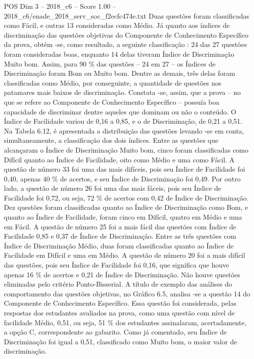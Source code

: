 \begin{textsample}{POS Dim 3 – 2018\_c6 – Score 1.00 – 2018\_c6/enade\_2018\_serv\_soc\_f2ecfc474e.txt}
Duas questões foram classificadas como Fácil, e outras 13 consideradas como Médio.
Já quanto aos índices de discriminação das questões objetivas do Componente de Conhecimento Específico da prova, obtém -se, como resultado, a seguinte classificação : 24 das 27 questões foram consideradas boas, enquanto 14 delas tiveram Índice de Discriminação Muito bom.
Assim, para 90 \% das questões – 24 em 27 – os Índices de Discriminação foram Bom ou Muito bom.
Dentre as demais, três delas foram classificadas como Médio, por conseguinte, a quantidade de questões nos patamares mais baixos de discriminação.
Constata -se, assim, que a prova – no que se refere ao Componente de Conhecimento Específico – possuía boa capacidade de discriminar dentre aqueles que dominam ou não o conteúdo.
O Índice de Facilidade variou de 0,16 a 0,85, e o de Discriminação, de 0,21 a 0,51.
Na Tabela 6.12, é apresentada a distribuição das questões levando -se em conta, simultaneamente, a classificação dos dois índices.
Entre as questões que alcançaram o Índice de Discriminação Muito bom, cinco foram classificadas como Difícil quanto ao Índice de Facilidade, oito como Médio e uma como Fácil.
A questão de número 33 foi uma das mais difíceis, pois seu Índice de Facilidade foi 0,40, apenas 40 \% de acertos, e seu Índice de Discriminação foi 0,49.
Por outro lado, a questão de número 26 foi uma das mais fáceis, pois seu Índice de Facilidade foi 0,72, ou seja, 72 \% de acertos com 0,42 de Índice de Discriminação.
Dez questões foram classificadas quanto ao Índice de Discriminação como Bom, e quanto ao Índice de Facilidade, foram cinco em Difícil, quatro em Médio e uma em Fácil.
A questão de número 25 foi a mais fácil das questões com Índice de Facilidade 0,85 e 0,37 de Índice de Discriminação.
Entre as três questões com Índice de Discriminação Médio, duas foram classificadas quanto ao Índice de Facilidade em Difícil e uma em Médio.
A questão de número 20 foi a mais difícil das questões, pois seu Índice de Facilidade foi 0,16, que significa que houve apenas 16 \% de acertos e 0,21 de Índice de Discriminação.
Não houve questões eliminadas pelo critério Ponto-Bisserial.
A título de exemplo das análises do comportamento das questões objetivas, no Gráfico 6.5, analisa -se a questão 14 do Componente de Conhecimento Específico.
Essa questão foi considerada, pelas respostas dos estudantes avaliados na prova, como uma questão com nível de facilidade Médio, 0,51, ou seja, 51 \% dos estudantes assinalaram, acertadamente, a opção C, correspondente ao gabarito.
Como já comentado, seu Índice de Discriminação foi igual a 0,51, classificado como Muito bom, o maior valor de discriminação.

\end{textsample}
